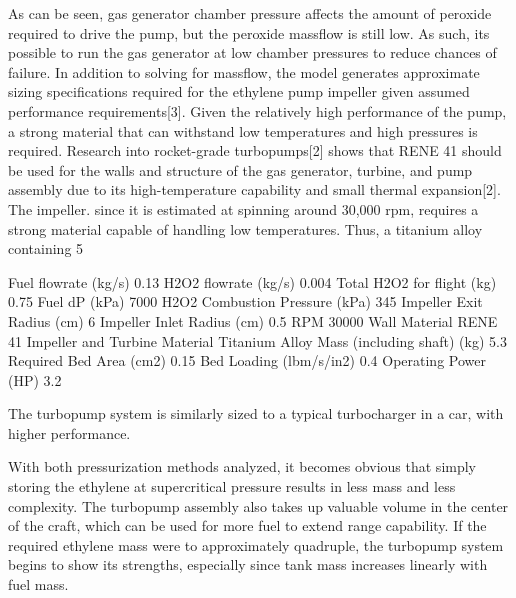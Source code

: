 As can be seen, gas generator chamber pressure affects the amount of peroxide required to drive the pump, but the peroxide massflow is still low. As such, its possible to run the gas generator at low chamber pressures to reduce chances of failure. In addition to solving for massflow, the model generates approximate sizing specifications required for the ethylene pump impeller given assumed performance requirements[3]. Given the relatively high performance of the pump, a strong material that can withstand low temperatures and high pressures is required. Research into rocket-grade turbopumps[2] shows that RENE 41 should be used for the walls and structure of the gas generator, turbine, and pump assembly due to its high-temperature capability and small thermal expansion[2]. The impeller. since it is estimated at spinning around 30,000 rpm, requires a strong material capable of handling low temperatures. Thus, a titanium alloy containing 5%


Fuel flowrate (kg/s)
0.13
H2O2 flowrate (kg/s)
0.004
Total H2O2 for flight (kg)
0.75
Fuel dP (kPa)
7000
H2O2 Combustion Pressure (kPa)
345
Impeller Exit Radius (cm)
6
Impeller Inlet Radius (cm)
0.5
RPM
30000
Wall Material
RENE 41
Impeller and Turbine Material
Titanium Alloy
Mass (including shaft) (kg)
5.3
Required Bed Area (cm2)
0.15
Bed Loading (lbm/s/in2)
0.4
Operating Power (HP)
3.2

The turbopump system is similarly sized to a typical turbocharger in a car, with higher performance. 

With both pressurization methods analyzed, it becomes obvious that simply storing the ethylene at supercritical pressure results in less mass and less complexity. The turbopump assembly also takes up valuable volume in the center of the craft, which can be used for more fuel to extend range capability. If the required ethylene mass were to approximately quadruple, the turbopump system begins to show its strengths, especially since tank mass increases linearly with fuel mass. 
